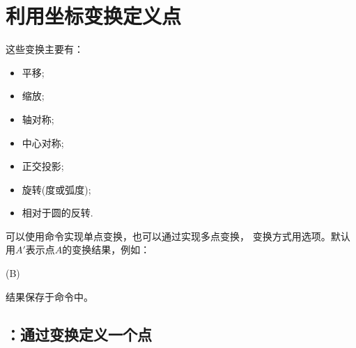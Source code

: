 \documentclass[../main.tex]{subfiles}
\begin{document}
\section{利用坐标变换定义点}

这些变换主要有：

\begin{itemize}
\item 平移;
\item 缩放;
\item 轴对称;
\item 中心对称;
\item 正交投影;
\item 旋转(度或弧度);
\item 相对于圆的反转.
\end{itemize}

可以使用命令实现单点变换，也可以通过实现多点变换，
变换方式用选项。默认用$A'$表示点$A$的变换结果，例如：

\begin{tkzltxexample}[small]
\tkzDefPointBy[translation= from A to A'](B)
\end{tkzltxexample}

结果保存于命令中。
\medskip

\subsection{：通过变换定义一个点}
\end{document}
